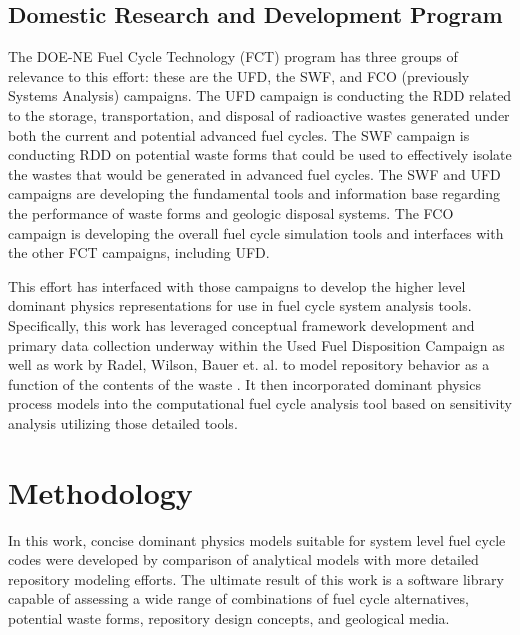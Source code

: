 \subsection{Domestic Research and Development Program}

The DOE-NE Fuel Cycle Technology (FCT) program has three groups of relevance to 
this effort: these are the \gls{UFD}, the \gls{SWF}, and \gls{FCO} (previously 
Systems Analysis) campaigns.  
The \gls{UFD} campaign is conducting the \gls{RDD} related to the storage, 
transportation, and disposal of radioactive wastes generated under both the 
current and potential advanced fuel cycles.  The SWF campaign is conducting 
\gls{RDD} on potential waste forms that could be used to effectively isolate the 
wastes that would be generated in advanced fuel cycles.  The \gls{SWF} and
\gls{UFD} campaigns are developing the fundamental tools and information base 
regarding the performance of waste forms and geologic disposal systems.  The 
\gls{FCO} campaign is developing the overall fuel cycle simulation tools and 
interfaces with the other FCT campaigns, including \gls{UFD}.  

This effort has interfaced with those campaigns to develop the higher level
dominant physics representations for use in fuel cycle system analysis tools.
Specifically, this work has leveraged conceptual framework development and
primary data collection underway within the Used Fuel Disposition Campaign as
well as work by Radel, Wilson, Bauer et. al. to model repository behavior as a
function of the contents of the waste \cite{radel_effect_2007}.  It then 
incorporated dominant physics process models into the \Cyclus computational 
fuel cycle analysis tool \cite{huff_cyclus:_2010} based on sensitivity analysis 
utilizing those detailed tools.

\section{Methodology} 


In this work, concise dominant physics models suitable for system level fuel 
cycle codes were developed by comparison of analytical models with more 
detailed repository modeling efforts. The ultimate result of this work is a 
software library capable of assessing a wide range of combinations 
of fuel cycle alternatives, potential waste forms, repository design concepts, 
and geological media. 


